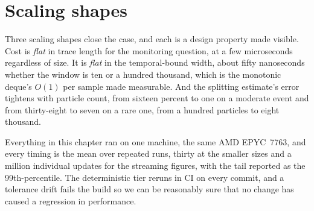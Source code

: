 \section{Scaling shapes}

Three scaling shapes close the case, and each is a design property made visible. Cost is \emph{flat} in trace length for the monitoring question, at a few microseconds regardless of size. It is \emph{flat} in the temporal-bound width, about fifty nanoseconds whether the window is ten or a hundred thousand, which is the monotonic deque's $O(1)$ per sample made measurable. And the splitting estimate's error tightens with particle count, from sixteen percent to one on a moderate event and from thirty-eight to seven on a rare one, from a hundred particles to eight thousand.

\begin{notebox}
Everything in this chapter ran on one machine, the same AMD EPYC~7763, and every timing is the mean over repeated runs, thirty at the smaller sizes and a million individual updates for the streaming figures, with the tail reported as the 99th-percentile. The deterministic tier reruns in CI on every commit, and a tolerance drift fails the build so we can be reasonably sure that no change has caused a regression in performance.
\end{notebox}